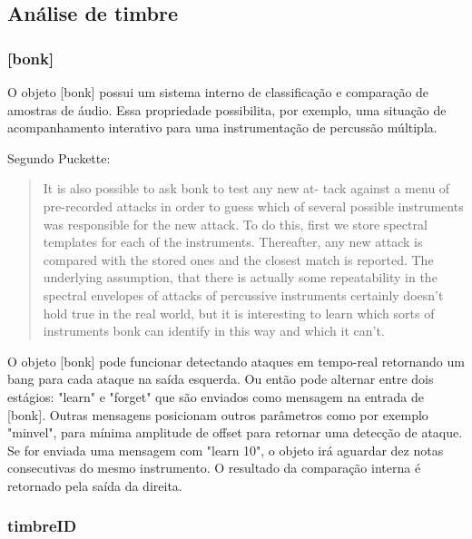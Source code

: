 \documentclass{ppgmus}
\begin{document}
\subsection{Análise de timbre}


\subsubsection{[bonk\texttildelow]}


O objeto [bonk\texttildelow] possui um sistema interno de classificação
e comparação de amostras de áudio. Essa propriedade possibilita, por exemplo, 
uma situação de acompanhamento interativo para uma instrumentação de 
percussão múltipla.

Segundo Puckette:

\begin{quotation}
It is also possible to ask bonk to test any new at-
tack against a menu of pre-recorded attacks in order
to guess which of several possible instruments was
responsible for the new attack. To do this, first we
store spectral templates for each of the instruments.
Thereafter, any new attack is compared with the
stored ones and the closest match is reported. The
underlying assumption, that there is actually some
repeatability in the spectral envelopes of attacks of
percussive instruments certainly doesn't hold true in
the real world, but it is interesting to learn which
sorts of instruments bonk can identify in this way
and which it can't.
\end{quotation}

O objeto [bonk\texttildelow] pode funcionar detectando
ataques em tempo-real retornando um bang para cada ataque 
na saída esquerda. Ou então pode alternar entre dois estágios:
"learn" e "forget" que são enviados como mensagem na entrada de 
[bonk\texttildelow]. Outras mensagens posicionam outros
parâmetros como por exemplo "minvel", para mínima amplitude de offset
para retornar uma detecção de ataque.
Se for enviada uma mensagem com "learn 10",
o objeto irá aguardar dez notas consecutivas do mesmo instrumento.
O resultado da comparação interna é retornado pela saída da direita.



\subsubsection{timbreID}
\end{document}
